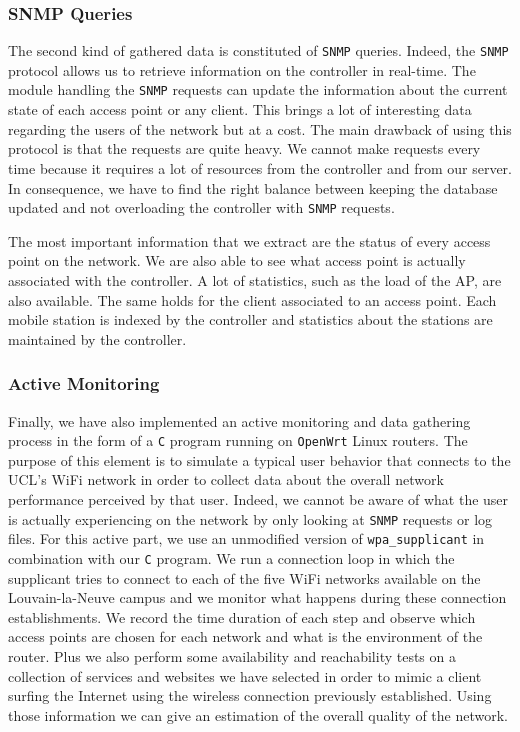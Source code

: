 \subsubsection{SNMP Queries}

The second kind of gathered data is constituted of \texttt{SNMP} queries. Indeed, the \texttt{SNMP} protocol allows us to retrieve information on the controller in real-time. The module handling the \texttt{SNMP} requests can update the information about the current state of each access point or any client. This brings a lot of interesting data regarding the users of the network but at a cost. The main drawback of using this protocol is that the requests are quite heavy. We cannot make requests every time because it requires a lot of resources from the controller and from our server. In consequence, we have to find the right balance between keeping the database updated and not overloading the controller with \texttt{SNMP} requests. 

The most important information that we extract are the status of every access point on the network. We are also able to see what access point is actually associated with the controller. A lot of statistics, such as the load of the AP, are also available. The same holds for the client associated to an access point. Each mobile station is indexed by the controller and statistics about the stations are maintained by the controller.


\subsubsection{Active Monitoring}
Finally, we have also implemented an active monitoring and data gathering process in the form of a \texttt{C} program running on \texttt{OpenWrt} Linux \cite{openwrt} routers. The purpose of this element is to simulate a typical user behavior that connects to the UCL's WiFi network in order to collect data about the overall network performance perceived by that user. Indeed, we cannot be aware of what the user is actually experiencing on the network by only looking at \texttt{SNMP} requests or log files. For this active part, we use an unmodified version of \texttt{wpa\_supplicant} in combination with our \texttt{C} program. We run a connection loop in which the supplicant tries to connect to each of the five WiFi networks available on the Louvain-la-Neuve campus and we monitor what happens during these connection establishments. We record the time duration of each step and observe which access points are chosen for each network and what is the environment of the router. Plus we also perform some availability and reachability tests on a collection of services and websites we have selected in order to mimic a client surfing the Internet using the wireless connection previously established. Using those information we can give an estimation of the overall quality of the network.


